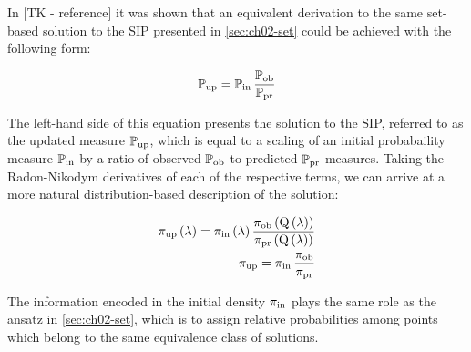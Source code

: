 In [TK - reference] it was shown that an equivalent derivation to the same set-based solution to the SIP presented in \ref{sec:ch02-set} could be achieved with the following form:

\begin{equation}
\dciP
\end{equation}


The left-hand side of this equation presents the solution to the SIP, referred to as the updated measure $\updatedP$, which is equal to a scaling of an initial probabaility measure $\initialP$ by a ratio of observed $\observedP$ to predicted $\predictedP$ measures.
Taking the Radon-Nikodym derivatives of each of the respective terms, we can arrive at a more natural distribution-based description of the solution:

\begin{equation}
\begin{split}
\dci\\
\dciD
\end{split}
\end{equation}

The information encoded in the initial density $\initial$ plays the same role as the ansatz in \ref{sec:ch02-set}, which is to assign relative probabilities among points which belong to the same equivalence class of solutions.
